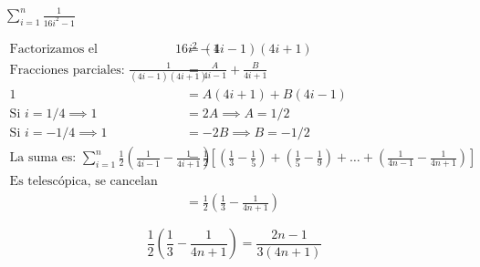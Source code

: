 $\displaystyle \sum_{i=1}^{n} \frac{1}{16i^2-1}$

\nopagebreak
\begin{align*}
\text{Factorizamos el denominador: } 16i^2 - 1 &= (4i-1)(4i+1) \\
\text{Fracciones parciales: } \frac{1}{(4i-1)(4i+1)} &= \frac{A}{4i-1} + \frac{B}{4i+1} \\
1 &= A(4i+1) + B(4i-1) \\
\text{Si } i=1/4 \implies 1 &= 2A \implies A=1/2 \\
\text{Si } i=-1/4 \implies 1 &= -2B \implies B=-1/2 \\
\text{La suma es: } \sum_{i=1}^{n} \frac{1}{2} \left( \frac{1}{4i-1} - \frac{1}{4i+1} \right) &= \frac{1}{2} \left[ \left( \frac{1}{3} - \frac{1}{5} \right) + \left( \frac{1}{5} - \frac{1}{9} \right) + \dots + \left( \frac{1}{4n-1} - \frac{1}{4n+1} \right) \right] \\
\text{Es telescópica, se cancelan términos intermedios:} \\
&= \frac{1}{2} \left( \frac{1}{3} - \frac{1}{4n+1} \right)
\end{align*}

\[
\boxed{\displaystyle \frac{1}{2} \left( \frac{1}{3} - \frac{1}{4n+1} \right) = \frac{2n-1}{3(4n+1)}}
\]
